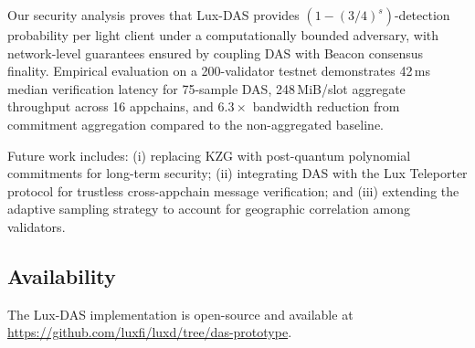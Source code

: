 \documentclass[11pt,a4paper]{article}
\theoremstyle{plain}
\theoremstyle{definition}
\theoremstyle{remark}
\begin{document}
Our security analysis proves that Lux-DAS provides $(1 - (3/4)^s)$-detection probability per
light client under a computationally bounded adversary, with network-level guarantees ensured
by coupling DAS with Beacon consensus finality. Empirical evaluation on a 200-validator
testnet demonstrates 42\,ms median verification latency for 75-sample DAS, 248\,MiB/slot
aggregate throughput across 16 appchains, and $6.3\times$ bandwidth reduction from commitment
aggregation compared to the non-aggregated baseline.

Future work includes: (i) replacing KZG with post-quantum polynomial commitments for long-term
security; (ii) integrating DAS with the Lux Teleporter protocol for trustless cross-appchain
message verification; and (iii) extending the adaptive sampling strategy to account for
geographic correlation among validators.

\subsection{Availability}

The Lux-DAS implementation is open-source and available at
\url{https://github.com/luxfi/luxd/tree/das-prototype}.
\end{document}
